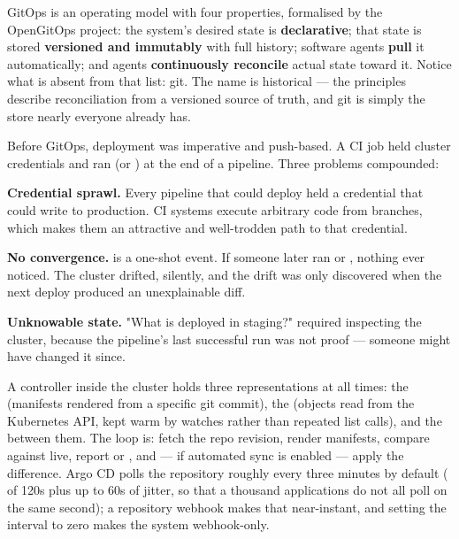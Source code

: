 
 GitOps is an operating model with four properties, formalised by the OpenGitOps project: the system's desired state is \textbf{declarative}; that state is stored \textbf{versioned and immutably} with full history; software agents \textbf{pull} it automatically; and agents \textbf{continuously reconcile} actual state toward it. Notice what is absent from that list: git. The name is historical --- the principles describe reconciliation from a versioned source of truth, and git is simply the store nearly everyone already has.

 Before GitOps, deployment was imperative and push-based. A CI job held cluster credentials and ran  (or ) at the end of a pipeline. Three problems compounded:

\begin{wbitem}
  \item \textbf{Credential sprawl.} Every pipeline that could deploy held a credential that could write to production. CI systems execute arbitrary code from branches, which makes them an attractive and well-trodden path to that credential.
  \item \textbf{No convergence.}  is a one-shot event. If someone later ran  or , nothing ever noticed. The cluster drifted, silently, and the drift was only discovered when the next deploy produced an unexplainable diff.
  \item \textbf{Unknowable state.} "What is deployed in staging?" required inspecting the cluster, because the pipeline's last successful run was not proof --- someone might have changed it since.
\end{wbitem}

 A controller inside the cluster holds three representations at all times: the  (manifests rendered from a specific git commit), the  (objects read from the Kubernetes API, kept warm by watches rather than repeated list calls), and the  between them. The loop is: fetch the repo revision, render manifests, compare against live, report  or , and --- if automated sync is enabled --- apply the difference. Argo CD polls the repository roughly every three minutes by default ( of 120s plus up to 60s of jitter, so that a thousand applications do not all poll on the same second); a repository webhook makes that near-instant, and setting the interval to zero makes the system webhook-only.

